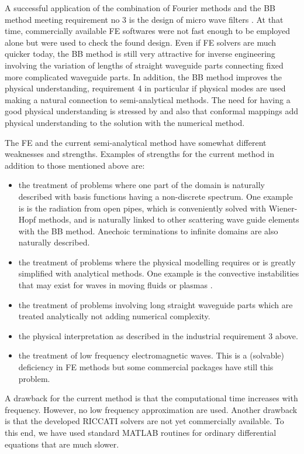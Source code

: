 \documentclass[numreferences]{kluwer}
\begin{document}
A successful application of the combination of Fourier methods and the
BB method meeting requirement no 3 is the design of micro wave filters
\cite{bironilsson2005}. At that time, commercially available FE
softwares were not fast enough to be employed alone but were used to check the
found design. Even if FE solvers are much quicker today, the BB method is still very attractive for inverse engineering involving the variation of lengths of straight waveguide parts connecting fixed more complicated waveguide parts. In addition, the BB method improves the physical understanding, requirement 4 in particular if physical modes are used making a natural connection to semi-analytical methods. The need for having a good physical understanding is stressed by \cite{nachbin+daSilvaSimoes:2012} and also that conformal mappings add physical understanding to the solution with the numerical method.

The FE and the current semi-analytical method have somewhat different
weaknesses and strengths. Examples of strengths for the current method in addition to those mentioned above
are:
\begin{itemize}
\item the treatment of problems where one part of the domain is
  naturally described with basis functions having a non-discrete
  spectrum. One example is is the radiation from open pipes, which is
  conveniently solved with Wiener-Hopf methods, and is naturally
  linked to other scattering wave guide elements with the BB
  method. Anechoic terminations to infinite domains are also naturally
  described.
\item the treatment of problems where the physical modelling requires
  or is greatly simplified with analytical methods. One example is the
  convective instabilities that may exist for waves in moving fluids
  \cite{nilssonbrander1980a} or plasmas \cite{briggs1964}.
\item the treatment of problems involving long straight waveguide parts which are treated analytically not adding numerical complexity.
\item the physical interpretation as described in the industrial
  requirement 3 above.
\item the treatment of low frequency electromagnetic waves. This is a
  (solvable) \cite{AndriulliCoolsOlyslagerMichielssen2008,chew2014}
  deficiency in FE methods but some commercial packages have still
  this problem.
\end{itemize}

A drawback for the current method is that the computational time increases with frequency. However, no low frequency approximation are used. Another drawback is that the developed RICCATI
solvers are not yet commercially available. To this end, we have used
standard MATLAB routines for ordinary differential equations that are
much slower.
\end{document}
